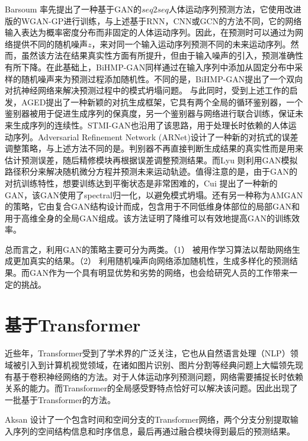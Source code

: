 Barsoum \etal \parencite{barsoum2018hp}率先提出了一种基于GAN的$seq2seq$人体运动序列预测方法，它使用改进版的WGAN-GP进行训练，与上述基于RNN，CNN或GCN的方法不同，它的网络输入表达为概率密度分布而非固定的人体运动序列。因此，在预测时可以通过为网络提供不同的随机噪声$z$，来对同一个输入运动序列预测不同的未来运动序列。然而，虽然该方法在结果真实性方面有所提升，但由于输入噪声的引入，预测准确性有所下降。在此基础上，BiHMP-GAN\parencite{kundu2019bihmp}同样通过在输入序列中添加从固定分布中采样的随机噪声来为预测过程添加随机性。不同的是，BiHMP-GAN提出了一个双向对抗神经网络来解决预测过程中的模式坍塌问题。
与此同时，受到上述工作的启发，AGED\parencite{gui2018adversarial}提出了一种新颖的对抗生成框架，它具有两个全局的循环鉴别器，一个鉴别器被用于促进生成序列的保真度，另一个鉴别器与网络进行联合训练，保证未来生成序列的连续性。STMI-GAN\parencite{hernandez2019human}也沿用了该思路，用于处理长时依赖的人体运动序列。Adversarial Refinement Network (ARNet)\parencite{chao2020adversarial}设计了一种新的对抗式的误差调整策略，与上述方法不同的是。判别器不再直接判断生成结果的真实性而是用来估计预测误差，随后精修模块再根据误差调整预测结果。而Lyu \etal \parencite{lyu2021learning}则利用GAN模拟路径积分来解决随机微分方程并预测未来运动轨迹。值得注意的是，由于GAN的对抗训练特性，想要训练达到平衡状态是非常困难的，Cui \etal\parencite{cui2021efficient}提出了一种新的GAN，该GAN使用了spectral归一化，以避免模式坍塌。还有另一种称为AMGAN\parencite{liu2021aggregated}的策略，它由复合GAN结构设计而成，包含用于不同低维身体部位的局部GAN和用于高维全身的全局GAN组成。该方法证明了降维可以有效地提高GAN的训练效率。

总而言之，利用GAN的策略主要可分为两类。（1） 被用作学习算法以帮助网络生成更加真实的结果。（2） 利用随机噪声向网络添加随机性，生成多样化的预测结果。而GAN作为一个具有明显优势和劣势的网络，也会给研究人员的工作带来一定的挑战。
\section{基于Transformer}
近些年，Transformer受到了学术界的广泛关注，它也从自然语言处理（NLP）领域被引入到计算机视觉领域，在诸如图片识别、图片分割等经典问题上大幅领先现有基于卷积神经网络的方法。对于人体运动序列预测问题，网络需要捕捉长时依赖关系的能力。而Transformer的全局感受野特点恰好可以解决该问题。因此出现了一批基于Transformer的方法\parencite{aksan2021spatio, cai2020learning}。

Aksan \etal \parencite{aksan2021spatio}设计了一个包含时间和空间分支的Transformer网络，两个分支分别提取输入序列的空间结构信息和时序信息，最后再通过融合模块得到最后的预测结果。

